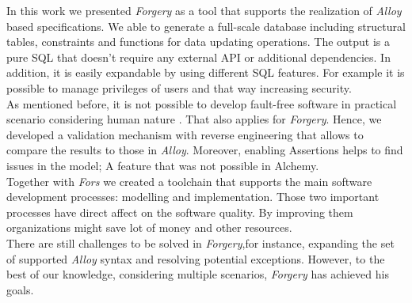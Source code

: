 \documentclass[oneside]{book}
\begin{document}
In this work we presented \textit{Forgery} as a tool that supports the realization of \textit{Alloy} based specifications. We able to generate a full-scale database including structural tables, constraints and functions for data updating operations. The output is a pure SQL that doesn't require any external API or additional dependencies. In addition, it is easily expandable by using different SQL features. For example it is possible to manage privileges of users and that way increasing security.\\ 

As mentioned before, it is not possible to develop fault-free software in practical scenario considering human nature \cite{reliability}. That also applies for \textit{Forgery}. Hence, we developed a validation mechanism with reverse engineering that allows to compare the results to those in \textit{Alloy}. Moreover, enabling Assertions helps to find issues in the model; A feature that was not possible in Alchemy.\\

Together with \textit{Fors} we created a toolchain that supports the main software development processes: modelling and implementation. Those two important processes have direct affect on the software quality. By improving them organizations might save lot of money and other resources.\\

There are still challenges to be solved in \textit{Forgery},for instance, expanding the set of supported \textit{Alloy} syntax and resolving potential exceptions. However, to the best of our knowledge, considering multiple scenarios, \textit{Forgery} has achieved his goals. 
\end{document}
